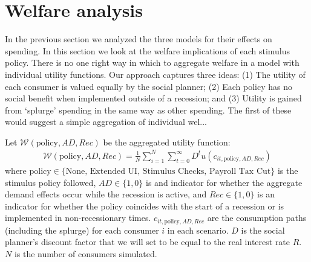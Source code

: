 \documentclass[../HAFiscal]{subfiles}
\begin{document}
\section{Welfare analysis}
\label{sec:welfare}

In the previous section we analyzed the three models for their effects on spending. In this section we look at the welfare implications of each stimulus policy. There is no one right way in which to aggregate welfare in a model with individual utility functions. Our approach captures three ideas: (1) The utility of each consumer is valued equally by the social planner; (2) Each policy has no social benefit when implemented outside of a recession; and (3) Utility is gained from `splurge' spending in the same way as other spending. The first of these would suggest a simple aggregation of individual wel...

Let  $\mathcal{W}(\text{policy},AD,Rec)$ be the aggregated utility function:
\begin{align}
	\mathcal{W}(\text{policy},AD,Rec) =\frac{1}{N}\sum_{i=1}^{N} \sum_{t=0}^{\infty} D^t  u(c_{it,\text{policy},AD,Rec}) 
\end{align}
where $\text{policy}\in \{\text{None, Extended UI, Stimulus Checks, Payroll Tax Cut}\}$ is the stimulus policy followed,  $AD\in\{1,0\}$ is and indicator for whether the aggregate demand effects occur while the recession is active, and  $Rec\in\{1,0\}$ is an indicator for whether the policy coincides with the start of a recession or is implemented in non-recessionary times. $c_{it,\text{policy},AD,Rec}$ are the consumption paths (including the splurge) for each consumer $i$ in each scenario. $D$ is the social planner's discount factor that we will set to be equal to the real interest rate $R$. $N$ is the number of consumers simulated.
\end{document}
